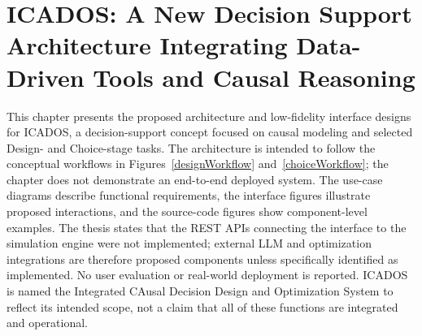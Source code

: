 \documentclass{sfuthesis}
\begin{document}
\chapter{ICADOS: A New Decision Support Architecture Integrating Data-Driven Tools and Causal Reasoning}
This chapter presents the proposed architecture and low-fidelity interface designs for ICADOS, a decision-support concept focused on causal modeling and selected Design- and Choice-stage tasks. The architecture is intended to follow the conceptual workflows in Figures~\ref{designWorkflow} and~\ref{choiceWorkflow}; the chapter does not demonstrate an end-to-end deployed system. The use-case diagrams describe functional requirements, the interface figures illustrate proposed interactions, and the source-code figures show component-level examples. The thesis states that the REST APIs connecting the interface to the simulation engine were not implemented; external LLM and optimization integrations are therefore proposed components unless specifically identified as implemented. No user evaluation or real-world deployment is reported. ICADOS is named the Integrated CAusal Decision Design and Optimization System to reflect its intended scope, not a claim that all of these functions are integrated and operational.
\end{document}
